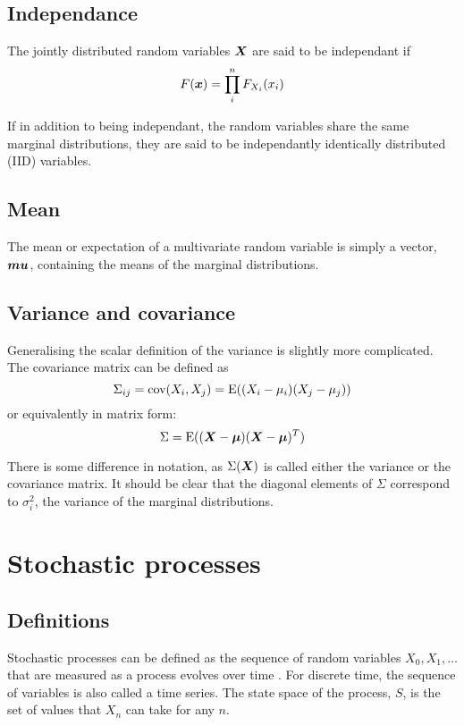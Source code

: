 \subsection{Independance}
The jointly distributed random variables $\boldsymbol{X}$ are said to be independant if 
\begin{equation}
  \label{eq:independance}
  F(\boldsymbol{x}) = \prod_i^n F_{X_i}(x_i)
\end{equation}

If in addition to being independant, the random variables share the same marginal distributions, they are said to be independantly identically distributed (IID) variables.

\subsection{Mean}
The mean or expectation of a multivariate random variable is simply a vector, $\boldsymbol{mu}$, containing the means of the marginal distributions.

\subsection{Variance and covariance}
Generalising the scalar definition of the variance is slightly more complicated.
The covariance matrix can be defined as 
\begin{equation}
  \label{eq:covariance}
  \Sigma_{ij} = \textrm{cov}(X_i, X_j) = \mathrm{E}((X_i-\mu_i)(X_j-\mu_j))
\end{equation}
or equivalently in matrix form:
\begin{equation}
  \label{eq:matrixcovariance}
  \Sigma = \mathrm{E}((\boldsymbol{X} - \boldsymbol{\mu})(\boldsymbol{X}-\boldsymbol{\mu})^T)
\end{equation}

There is some difference in notation, as $\Sigma(\boldsymbol{X})$ is called either the variance or the covariance matrix.
It should be clear that the diagonal elements of $\Sigma$ correspond to $\sigma_i^2$, the variance of the marginal distributions.

\section{Stochastic processes}
\label{sec:stochastic-processes}
\subsection{Definitions}
Stochastic processes can be defined as the sequence of random variables ${X_0, X_1,\dots}$ that are measured as a process evolves over time \citep[107]{kulkarni1999modeling}.
For discrete time, the sequence of variables is also called a time series.
The state space of the process, $S$, is the set of values that $X_n$ can take for any $n$.

